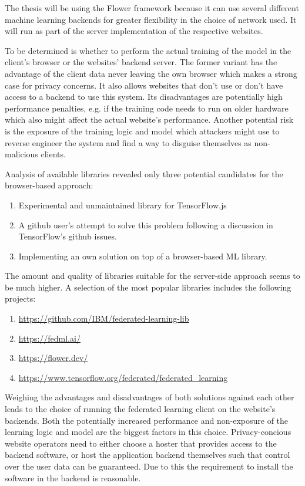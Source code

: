 \documentclass[
    fontsize=12pt,
    headings=small,
    parskip=half,           %
    bibliography=totoc,
    numbers=noenddot,       %
    open=any,               %
    ]{scrreprt}
\begin{document}
The thesis will be using the Flower framework because it can use several different machine learning backends for greater flexibility in the choice of network used. It will run as part of the server implementation of the respective websites.

To be determined is whether to perform the actual training of the model in the client's browser or the websites' backend server. The former variant has the advantage of the client data never leaving the own browser which makes a strong case for privacy concerns. It also allows websites that don't use or don't have access to a backend to use this system. Its disadvantages are potentially high performance penalties, e.g. if the training code needs to run on older hardware which also might affect the actual website's performance. Another potential risk is the exposure of the training logic and model which attackers might use to reverse engineer the system and find a way to disguise themselves as non-malicious clients.

Analysis of available libraries revealed only three potential candidates for the browser-based approach:

\begin{enumerate}
	\item Experimental and unmaintained library for TensorFlow.js \cite{PAIRFL2019}
	\item A github user's attempt \cite{SaFL2019} to solve this problem following a discussion in TensorFlow's github issues.
	\item Implementing an own solution on top of a browser-based ML library.
\end{enumerate}

The amount and quality of libraries suitable for the server-side approach seems to be much higher. A selection of the most popular libraries includes the following projects:

\begin{enumerate}
	\item \url{https://github.com/IBM/federated-learning-lib}
	\item \url{https://fedml.ai/}
	\item \url{https://flower.dev/}
	\item \url{https://www.tensorflow.org/federated/federated_learning}
\end{enumerate}

Weighing the advantages and disadvantages of both solutions against each other leads to the choice of running the federated learning client on the website's backends. Both the potentially increased performance and non-exposure of the learning logic and model are the biggest factors in this choice. Privacy-concious website operators need to either choose a hoster that provides access to the backend software, or host the application backend themselves such that control over the user data can be guaranteed. Due to this the requirement to install the software in the backend is reasonable.
\end{document}
